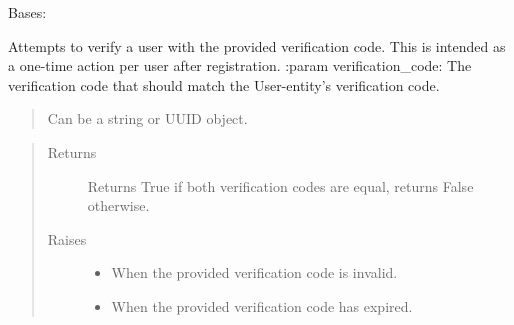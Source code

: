 \documentclass[letterpaper,10pt,english]{sphinxmanual}
\begin{document}

\begin{fulllineitems}
\label{\detokenize{pydash_app.user.verification:pydash_app.user.verification.VerificationCodeExpiredError}}
Bases: 

\end{fulllineitems}


\begin{fulllineitems}
\label{\detokenize{pydash_app.user.verification:pydash_app.user.verification.verify}}
Attempts to verify a user with the provided verification code.
This is intended as a one-time action per user after registration.
:param verification\_code: The verification code that should match the User-entity’s verification code.
\begin{quote}

Can be a string or UUID object.
\end{quote}
\begin{quote}\begin{description}
\item[{Returns}] \leavevmode
Returns True if both verification codes are equal, returns False otherwise.

\item[{Raises}] \leavevmode\begin{itemize}
\item {} 
{\hyperref[\detokenize{pydash_app.user.verification:pydash_app.user.verification.InvalidVerificationCodeError}]{}} \textendash{} When the provided verification code is invalid.

\item {} 
{\hyperref[\detokenize{pydash_app.user.verification:pydash_app.user.verification.VerificationCodeExpiredError}]{}} \textendash{} When the provided verification code has expired.

\end{itemize}

\end{description}\end{quote}

\end{fulllineitems}
\end{document}
